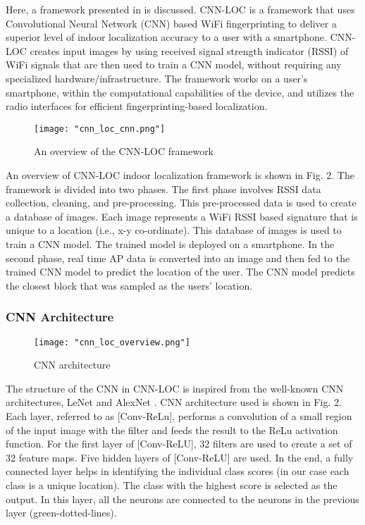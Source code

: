     Here, a framework presented in \cite{cnn} is discussed. CNN-LOC is a framework that uses Convolutional Neural Network (CNN) based WiFi fingerprinting to deliver a superior level of indoor localization accuracy to a user with a smartphone. CNN-LOC creates input images by using received signal strength indicator (RSSI) of WiFi signals that are then used to train a CNN model, without requiring any specialized hardware/infrastructure. The framework works on a user’s smartphone, within the computational capabilities of the device, and utilizes the radio interfaces for efficient fingerprinting-based localization. 
    
    	\begin{figure}[H]
    		\captionsetup{justification=centering}
    		\texttt{[image: "cnn\_loc\_cnn.png"]}
    		\caption{An overview of the CNN-LOC framework \cite[Fig. 2]{cnn}}
    	\end{figure}
    	
    An overview of CNN-LOC indoor localization framework is shown in Fig. 2. The framework is divided into two phases. The first phase involves RSSI data collection, cleaning, and pre-processing. This pre-processed data is used to create a database of images. Each image represents a WiFi RSSI based signature that is unique to a location (i.e., x-y co-ordinate). This database of images is used to train a CNN model. The trained model is deployed on a smartphone. In the second phase, real time AP data is converted into an image and then fed to the trained CNN model to predict the location of the user. The CNN model predicts the closest block that was sampled as the users’ location.
    
    \subsubsection{CNN Architecture}
    	\begin{figure}[H]
    		\captionsetup{justification=centering}
    		\texttt{[image: "cnn\_loc\_overview.png"]}
    		\caption{CNN architecture \cite[Fig. 1]{cnn}}
    	\end{figure}
    	
    The structure of the CNN in CNN-LOC is inspired from the well-known CNN architectures, LeNet \cite{lenet} and AlexNet \cite{alexNet}. CNN architecture used is shown in Fig. 2. Each layer, referred to as [Conv-ReLu], performs a convolution of a small region of the input image with the filter and feeds the result to the ReLu activation function. For the first layer of [Conv-ReLU], 32 filters are used to create a set of 32 feature maps. Five hidden layers of [Conv-ReLU] are used. In the end, a fully connected layer helps in identifying the individual class scores (in our case each class is a unique location). The class with the highest score is selected as the output. In this layer, all the neurons are connected to the neurons in the previous layer (green-dotted-lines).
    
